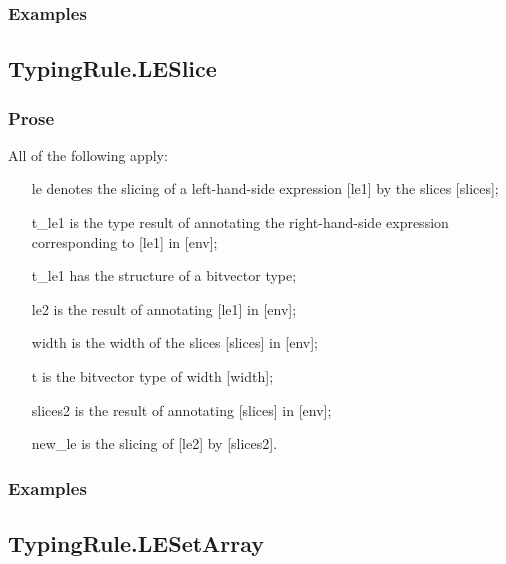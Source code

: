 \documentclass{book}
\begin{document}
    \subsubsection{Examples}

\subsection{TypingRule.LESlice}

    \subsubsection{Prose}
    All of the following apply:
   \begin{itemize}
   \item [le] denotes the slicing of a left-hand-side expression [le1] by the slices [slices];
   \item [t\_le1] is the type result of annotating the right-hand-side expression corresponding to [le1] in [env];
   \item [t\_le1] has the structure of a bitvector type;
   \item [le2] is the result of annotating [le1] in [env];
   \item [width] is the width of the slices [slices] in [env];
   \item [t] is the bitvector type of width [width];
   \item [slices2] is the result of annotating [slices] in [env];
   \item [new\_le] is the slicing of [le2] by [slices2].
   \end{itemize}
 
    \subsubsection{Examples}

\subsection{TypingRule.LESetArray}
\end{document}
